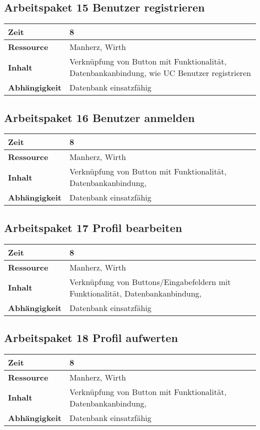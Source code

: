 \documentclass[12pt,a4paper,onecolumn]{article}
\begin{document}
\subsection{Arbeitspaket 15 Benutzer registrieren}
\begin{tabularx}{\textwidth}{|l|X|}
\hline
     \textbf{Zeit} & 8 \\
     \hline
     \textbf{Ressource} & Manherz, Wirth\\
     \hline
     \textbf{Inhalt} & Verknüpfung von Button mit Funktionalität, Datenbankanbindung, wie UC Benutzer registrieren\\
     \hline
     \textbf{Abhängigkeit} & Datenbank einsatzfähig\\
\hline
\end{tabularx}

\subsection{Arbeitspaket 16 Benutzer anmelden}
\begin{tabularx}{\textwidth}{|l|X|}
\hline
     \textbf{Zeit} & 8\\
     \hline
     \textbf{Ressource} & Manherz, Wirth\\
     \hline
     \textbf{Inhalt} &  Verknüpfung von Button mit Funktionalität, Datenbankanbindung,\\
     \hline
     \textbf{Abhängigkeit} & Datenbank einsatzfähig\\
\hline
\end{tabularx}

\subsection{Arbeitspaket 17 Profil bearbeiten}
\begin{tabularx}{\textwidth}{|l|X|}
\hline
     \textbf{Zeit} & 8\\
     \hline
     \textbf{Ressource} & Manherz, Wirth\\
     \hline
     \textbf{Inhalt} &  Verknüpfung von Buttons/Eingabefeldern mit Funktionalität, Datenbankanbindung,\\
     \hline
     \textbf{Abhängigkeit} & Datenbank einsatzfähig\\
\hline
\end{tabularx}

\subsection{Arbeitspaket 18 Profil aufwerten}
\begin{tabularx}{\textwidth}{|l|X|}
\hline
     \textbf{Zeit} & 8 \\
     \hline
     \textbf{Ressource} & Manherz, Wirth\\
     \hline
     \textbf{Inhalt} &  Verknüpfung von Button mit Funktionalität, Datenbankanbindung,\\
     \hline
     \textbf{Abhängigkeit} & Datenbank einsatzfähig\\
\hline
\end{tabularx}
\end{document}
